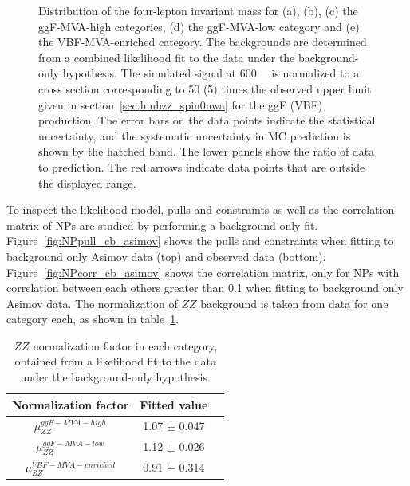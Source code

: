 \begin{figure}[!ht]
\begin{center}
    \caption{Distribution of the four-lepton invariant mass \mfl  
        for (a), (b), (c) the ggF-MVA-high categories, (d) the ggF-MVA-low category 
        and (e) the VBF-MVA-enriched category. 
    The backgrounds are determined from a combined likelihood fit to the data under the background-only 
    hypothesis. The simulated signal at 600~\gev~ is normalized to 
    a cross section corresponding to 50 (5) times the observed upper limit given in section~\ref{sec:hmhzz_spin0nwa}
    for the ggF (VBF) production.
    The error bars on the data points indicate the statistical uncertainty, 
    and the systematic uncertainty in MC prediction is shown by the hatched band. 
    The lower panels show the ratio of data to prediction.
    The red arrows indicate data points that are outside the displayed range.}   
  \label{fig:m4l_postfit} 
  \end{center}
\end{figure}


To inspect the likelihood model, pulls and constraints as well as the correlation matrix of NPs are studied by performing a background only fit.
Figure~\ref{fig:NPpull_cb_asimov} shows the pulls and constraints when fitting to background only Asimov data (top) and observed data (bottom).
Figure~\ref{fig:NPcorr_cb_asimov} shows the correlation matrix, only for NPs with correlation between each others greater than 0.1 when fitting to background only Asimov data.
The normalization of $ZZ$ background is taken from data for one category each, as shown in table~\ref{tab:muZZ_bonly_dnn}.

\begin{table}[htbp]
  \centering
  \caption{$ZZ$ normalization factor in each category, obtained from a likelihood fit to the data under the background-only hypothesis.}
  \label{tab:muZZ_bonly_dnn}
  \small
  \begin{spacing}{1.0}
  \begin{tabular}{ccc}
    \toprule
    Normalization factor  & Fitted value \\
    \midrule
    $\mu_{ZZ}^{ggF-MVA-high}$  & 1.07 $\pm$ 0.047 \\
    \hline
    $\mu_{ZZ}^{ggF-MVA-low}$   & 1.12 $\pm$ 0.026 \\
    \hline
    $\mu_{ZZ}^{VBF-MVA-enriched}$  & 0.91 $\pm$ 0.314 \\
    \bottomrule
  \end{tabular}
  \end{spacing}
\end{table}

